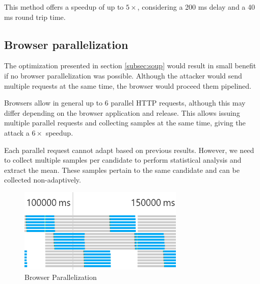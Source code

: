 This method offers a speedup of up to $5\times$, considering a 200
ms delay and a 40 ms round trip time.



\subsection{Browser parallelization}

The optimization presented in section \ref{subsec:soup} would result in small benefit if no browser
parallelization was possible. Although the attacker would send multiple requests at the same time, the browser
would proceed them pipelined. 

Browsers allow in general up to 6 parallel HTTP requests, although this may differ depending
on the browser application and release. This allows issuing multiple parallel requests and
collecting samples at the same time, giving the attack a $6\times$ speedup.

Each parallel request cannot adapt based on previous results.
However, we need to collect multiple samples per candidate to perform
statistical analysis and extract the mean. These samples pertain to the same
candidate and can be collected non-adaptively.

\begin{figure}[H] \caption{Browser Parallelization} \centering
\includegraphics[width=0.7\textwidth]{diagrams/parallel.png}\end{figure}

